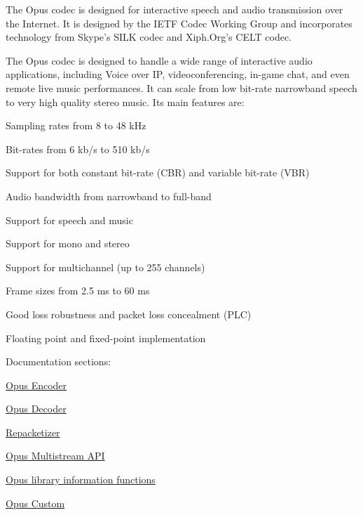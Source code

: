 The Opus codec is designed for interactive speech and audio transmission over the Internet. It is designed by the IETF Codec Working Group and incorporates technology from Skype's SILK codec and Xiph.Org's CELT codec.

The Opus codec is designed to handle a wide range of interactive audio applications, including Voice over IP, videoconferencing, in-\/game chat, and even remote live music performances. It can scale from low bit-\/rate narrowband speech to very high quality stereo music. Its main features are:

\begin{DoxyItemize}
\item Sampling rates from 8 to 48 kHz \item Bit-\/rates from 6 kb/s to 510 kb/s \item Support for both constant bit-\/rate (CBR) and variable bit-\/rate (VBR) \item Audio bandwidth from narrowband to full-\/band \item Support for speech and music \item Support for mono and stereo \item Support for multichannel (up to 255 channels) \item Frame sizes from 2.5 ms to 60 ms \item Good loss robustness and packet loss concealment (PLC) \item Floating point and fixed-\/point implementation\end{DoxyItemize}
Documentation sections: \begin{DoxyItemize}
\item \hyperlink{group__opus__encoder}{Opus Encoder} \item \hyperlink{group__opus__decoder}{Opus Decoder} \item \hyperlink{group__opus__repacketizer}{Repacketizer} \item \hyperlink{group__opus__multistream}{Opus Multistream API} \item \hyperlink{group__opus__libinfo}{Opus library information functions} \item \hyperlink{group__opus__custom}{Opus Custom} \end{DoxyItemize}
